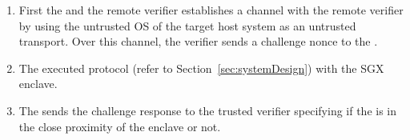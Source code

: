\begin{enumerate}[leftmargin=*]
  \item First the \device and the remote verifier establishes a \tls channel with the remote verifier by using the untrusted OS of the target host system as an untrusted transport. Over this \tls channel, the verifier sends a challenge nonce to the \device.
  \item The \device executed \name protocol (refer to Section~\ref{sec:systemDesign}) with the SGX enclave.
  \item The \device sends the challenge response to the trusted verifier specifying if the \device is in the close proximity of the enclave or not.  
\end{enumerate}